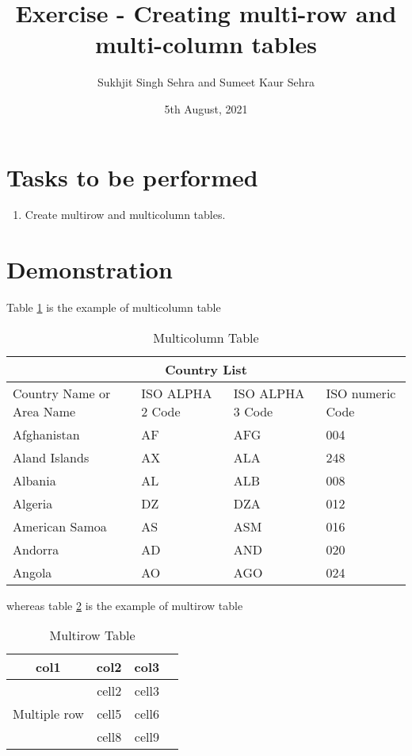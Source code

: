 \documentclass{article}
\title{Exercise  - Creating multi-row and multi-column tables}
\author{Sukhjit Singh Sehra and Sumeet Kaur Sehra}
\date{5th August, 2021}
\begin{document}
	\maketitle	
	\section*{Tasks to be performed}
	\begin{enumerate}	
		\item Create multirow and multicolumn tables.
	\end{enumerate}
	\section*{Demonstration}
	Table \ref{table:2} is the example of multicolumn table
	\begin{table}[h]
		\centering

	\begin{tabular}{ |p{3cm}||p{3cm}|p{3cm}|p{3cm}|  }
		\hline
		\multicolumn{4}{|c|}{Country List} \\
		\hline
		Country Name     or Area Name& ISO ALPHA 2 Code &ISO ALPHA 3 Code&ISO numeric Code\\
		\hline
		Afghanistan   & AF    &AFG&   004\\
		Aland Islands&   AX  & ALA   &248\\
		Albania &AL & ALB&  008\\
		Algeria    &DZ & DZA&  012\\
		American Samoa&   AS  & ASM&016\\
		Andorra& AD  & AND   &020\\
		Angola& AO  & AGO&024\\
		\hline
		\end{tabular}
		\caption{Multicolumn Table}
		\label{table:2}
			\end{table}
			
	whereas	table \ref{table:3} is the example of multirow table
			\begin{table}[h]
				\centering
			\begin{tabular}{ |c|c|c|c| } 
		\hline
		col1 & col2 & col3 \\
		\hline
		\multirow{3}{4em}{Multiple row} & cell2 & cell3 \\ 
		& cell5 & cell6 \\ 
		& cell8 & cell9 \\ 
		\hline
	\end{tabular}
\caption{Multirow Table}
\label{table:3}
\end{table}
\end{document}
